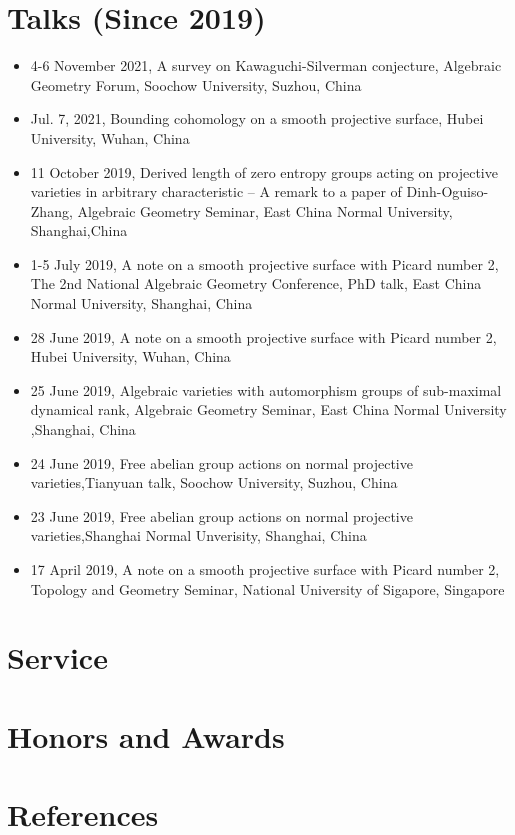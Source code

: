 \documentclass{resume}
\begin{document}
\section{\bf Talks (Since 2019)}
\begin{itemize}
\item  4-6 November 2021, A survey on Kawaguchi-Silverman conjecture, Algebraic Geometry Forum, Soochow University, Suzhou, China
\item Jul. 7, 2021, Bounding cohomology on a smooth projective surface, Hubei University, Wuhan, China
\item   11 October 2019, Derived length of zero entropy groups acting on projective varieties in arbitrary characteristic -- A remark to a paper of Dinh-Oguiso-Zhang, Algebraic Geometry Seminar, East China Normal University, Shanghai,China 
\item  1-5 July  2019, A note on a smooth projective surface with Picard number 2, The 2nd National Algebraic Geometry Conference, PhD talk, East China Normal University, Shanghai, China 
\item  28 June 2019, A note on a smooth projective surface with Picard number 2, Hubei University, Wuhan, China 
\item   25 June 2019, Algebraic varieties with automorphism groups of sub-maximal dynamical rank, Algebraic Geometry Seminar, East China Normal University ,Shanghai, China 
\item  24 June 2019, Free abelian group actions on normal projective varieties,Tianyuan talk, Soochow University, Suzhou, China
\item  23 June 2019, Free abelian group actions on normal projective varieties,Shanghai Normal Unverisity, Shanghai, China 
\item  17 April 2019, A note on a smooth projective surface with Picard number 2, Topology and Geometry Seminar, National University of Sigapore, Singapore
\end{itemize}
\section{\bf Service}
\section{\bf Honors and Awards}
\section{\bf References}
\end{document}
